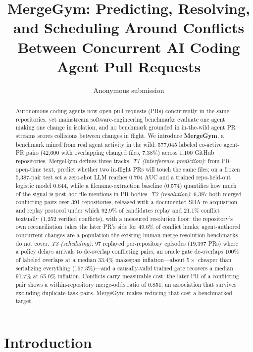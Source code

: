 \documentclass{article}
\title{MergeGym: Predicting, Resolving, and Scheduling Around Conflicts Between Concurrent AI Coding Agent Pull Requests}
\author{Anonymous submission}
\date{}
\begin{document}
\maketitle

\begin{abstract}
Autonomous coding agents now open pull requests (PRs) concurrently in the same repositories, yet mainstream software-engineering benchmarks evaluate one agent making one change in isolation, and no benchmark grounded in in-the-wild agent PR streams scores collisions between changes in flight. We introduce \textbf{MergeGym}, a benchmark mined from real agent activity in the wild: 577{,}045 labeled co-active agent-PR pairs (42{,}600 with overlapping changed files, 7.38\%) across 1{,}100 GitHub repositories. %
MergeGym defines three tracks. \emph{T1 (interference prediction)}: from PR-open-time text, predict whether two in-flight PRs will touch the same files; on a frozen 5{,}387-pair test set a zero-shot LLM reaches 0.704 AUC and a trained repo-held-out logistic model 0.644, while a filename-extraction baseline (0.574) quantifies how much of the signal is post-hoc file mentions in PR bodies. %
\emph{T2 (resolution)}: 6{,}387 both-merged conflicting pairs over 391 repositories, released with a documented SHA re-acquisition and replay protocol under which 92.9\% of candidates replay and 21.1\% conflict textually (1{,}252 verified conflicts), with a measured resolution floor: the repository's own reconciliation takes the later PR's side for 49.6\% of conflict hunks; agent-authored concurrent changes are a population the existing human-merge resolution benchmarks do not cover. %
\emph{T3 (scheduling)}: 97 replayed per-repository episodes (19{,}397 PRs) where a policy delays arrivals to de-overlap conflicting pairs; an oracle gate de-overlaps 100\% of labeled overlaps at a median 33.4\% makespan inflation---about $5\times$ cheaper than serializing everything (167.3\%)---and a causally-valid trained gate recovers a median 91.7\% at 65.0\% inflation. %
Conflicts carry measurable cost: the later PR of a conflicting pair shows a within-repository merge-odds ratio of 0.851, an association that survives excluding duplicate-task pairs. %
MergeGym makes reducing that cost a benchmarked target.
\end{abstract}

\section{Introduction}
\label{sec:intro}
\end{document}
